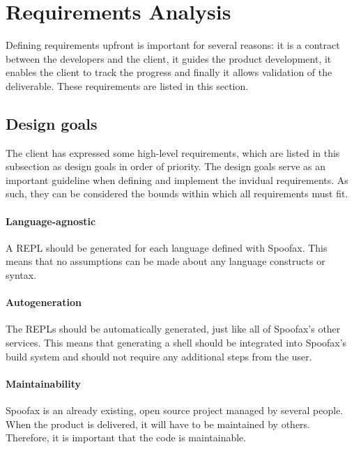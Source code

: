 \section{Requirements Analysis}
\label{sec:requirement-analysis}

Defining requirements upfront is important for several reasons: it is a contract
between the developers and the client, it guides the product development, it
enables the client to track the progress and finally it allows validation of the
deliverable. These requirements are listed in this section.

\subsection{Design goals}
\label{ssec:goals}


The client has expressed some high-level requirements, which are listed in this
subsection as design goals in order of priority. The design goals serve as an
important guideline when defining and implement the invidual requirements. As
such, they can be considered the bounds within which all requirements must fit.

\paragraph{Language-agnostic} A REPL should be generated for each language
defined with Spoofax. This means that no assumptions can be made about any
language constructs or syntax.

\paragraph{Autogeneration} The REPLs should be automatically generated, just
like all of Spoofax's other services. This means that generating a shell should
be integrated into Spoofax's build system and should not require any additional
steps from the user.

\paragraph{Maintainability} Spoofax is an already existing, open source project
managed by several people. When the product is delivered, it will have to be
maintained by others. Therefore, it is important that the code is maintainable.

